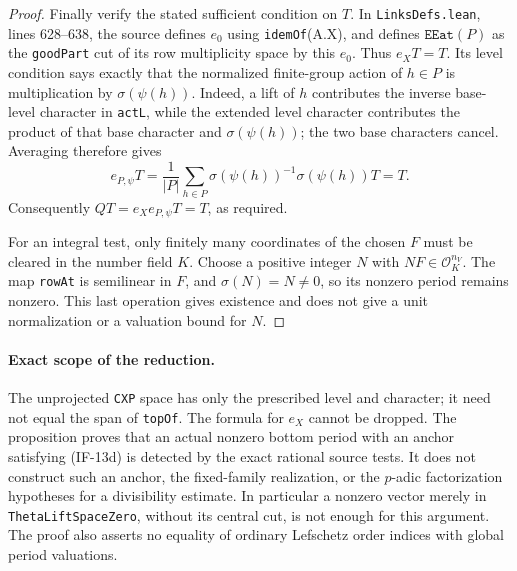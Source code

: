 \begin{proof}
Finally verify the stated sufficient condition on $T$.
In \texttt{LinksDefs.lean}, lines 628--638, the source defines
$e_0$ using \texttt{idemOf}(A.X), and defines
$\texttt{EEat}(P)$ as the \texttt{goodPart} cut of its row
multiplicity space by this $e_0$. Thus $e_XT=T$. Its level
condition says exactly that the normalized finite-group action
of $h\in P$ is multiplication by $\sigma(\psi(h))$.
Indeed, a lift of $h$ contributes the inverse base-level character
in \texttt{actL}, while the extended level character contributes
the product of that base character and $\sigma(\psi(h))$;
the two base characters cancel. Averaging therefore gives
\[
 e_{P,\psi}T
   =\frac1{|P|}\sum_{h\in P}
        \sigma(\psi(h))^{-1}\sigma(\psi(h))T=T.
\]
Consequently $QT=e_Xe_{P,\psi}T=T$, as required.

For an integral test, only finitely many coordinates of the chosen
$F$ must be cleared in the number field $K$. Choose a positive
integer $N$ with $NF\in\mathcal O_K^{n_V}$. The map
\texttt{rowAt} is semilinear in $F$, and
$\sigma(N)=N\ne0$, so its nonzero period remains nonzero.
This last operation gives existence and does not give a unit
normalization or a valuation bound for $N$.
\end{proof}

\paragraph{Exact scope of the reduction.}
The unprojected \texttt{CXP} space has only the prescribed level
and character; it need not equal the span of \texttt{topOf}.
The formula for $e_X$ cannot be dropped. The proposition proves
that an actual nonzero bottom period with an anchor satisfying
(IF-13d) is detected by the exact rational source tests. It does
not construct such an anchor, the fixed-family realization, or
the $p$-adic factorization hypotheses for a divisibility estimate.
In particular a nonzero vector merely in
\texttt{ThetaLiftSpaceZero}, without its central cut, is not
enough for this argument. The proof also asserts no equality of
ordinary Lefschetz order indices with global period valuations.
